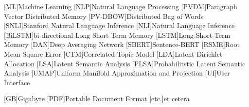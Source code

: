 \begin{acronym}[XXXXXXXXX]
    [ML]{Machine Learning}
    [NLP]{Natural Language Processing}
    [PVDM]{Paragraph Vector Distributed Memory}
    [PV-DBOW]{Distributed Bag of Words}
    [SNLI]{Stanford Natural Language Inference}
    [NLI]{Natural Language Inference}
    [BiLSTM]{bi-directional Long Short-Term Memory}
    [LSTM]{Long Short-Term Memory}
    [DAN]{Deep Averaging Network}
    [SBERT]{Sentence-BERT}
    [RSME]{Root Mean Square Error}
    [CTM]{Correlated Topic Model}
    [LDA]{Latent Dirichlet Allocation}
    [LSA]{Latent Semantic Analysis}
    [PLSA]{Probabilitstic Latent Semantic Analysis}
    [UMAP]{Uniform Manifold Approximation and Projection}
    [UI]{User Interface}


    \vspace{\parskip}
    [GB]{Gigabyte}
    [PDF]{Portable Document Format}
    [etc.]{et cetera}

\end{acronym}
